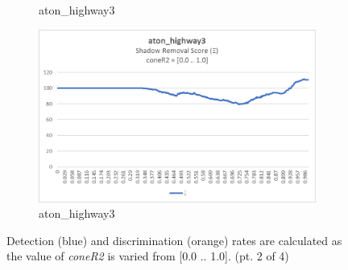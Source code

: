 \begin{appendices}
\begin{figure}
\begin{subfigure}{.45\linewidth}
  \caption{aton\_highway3}
\end{subfigure}
\hfill
\begin{subfigure}{.45\linewidth}
  \includegraphics[width=1\linewidth]{figures/appendix/highway3_coneR2_score.jpg}
  \caption{aton\_highway3}
\end{subfigure}

\caption{Detection (blue) and discrimination (orange) rates are calculated as the value of \textit{coneR2} is varied from [0.0 .. 1.0]. (pt. 2 of 4)}
\end{figure}


\end{appendices}
